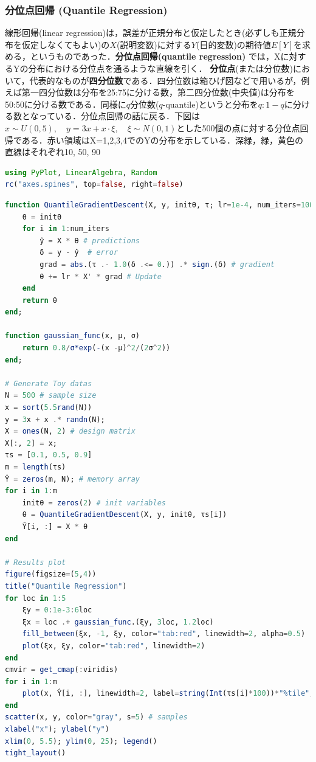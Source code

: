 \subsubsection{分位点回帰 (Quantile Regression)}
線形回帰(linear regression)は，誤差が正規分布と仮定したとき(必ずしも正規分布を仮定しなくてもよい)の$X$(説明変数)に対する$Y$(目的変数)の期待値$E[Y]$を求める，というものであった．\textbf{分位点回帰(quantile regression)} では，Xに対するYの分布における分位点を通るような直線を引く．
\textbf{分位点}(または分位数)において，代表的なものが\textbf{四分位数}である．四分位数は箱ひげ図などで用いるが，例えば第一四分位数は分布を25:75に分ける数，第二四分位数(中央値)は分布を50:50に分ける数である．同様に$q$分位数($q$-quantile)というと分布を$q:1-q$に分ける数となっている．分位点回帰の話に戻る．下図は$x\sim U(0, 5),\quad y=3x+x\cdot \xi,\quad \xi\sim N(0,1)$とした500個の点に対する分位点回帰である．赤い領域はX=1,2,3,4でのYの分布を示している．深緑，緑，黄色の直線はそれぞれ10, 50, 90%
\begin{lstlisting}[language=julia]
using PyPlot, LinearAlgebra, Random
rc("axes.spines", top=false, right=false)
\end{lstlisting}
\begin{lstlisting}[language=julia]
function QuantileGradientDescent(X, y, initθ, τ; lr=1e-4, num_iters=10000)
    θ = initθ
    for i in 1:num_iters
        ŷ = X * θ # predictions
        δ = y - ŷ  # error
        grad = abs.(τ .- 1.0(δ .<= 0.)) .* sign.(δ) # gradient
        θ += lr * X' * grad # Update
    end
    return θ
end;

function gaussian_func(x, μ, σ)
    return 0.8/σ*exp(-(x -μ)^2/(2σ^2))
end;

# Generate Toy datas
N = 500 # sample size
x = sort(5.5rand(N))
y = 3x + x .* randn(N);
X = ones(N, 2) # design matrix
X[:, 2] = x;
τs = [0.1, 0.5, 0.9]
m = length(τs) 
Ŷ = zeros(m, N); # memory array
for i in 1:m
    initθ = zeros(2) # init variables
    θ = QuantileGradientDescent(X, y, initθ, τs[i])
    Ŷ[i, :] = X * θ
end

# Results plot
figure(figsize=(5,4))
title("Quantile Regression")
for loc in 1:5
    ξy = 0:1e-3:6loc
    ξx = loc .+ gaussian_func.(ξy, 3loc, 1.2loc)
    fill_between(ξx, -1, ξy, color="tab:red", linewidth=2, alpha=0.5)
    plot(ξx, ξy, color="tab:red", linewidth=2)
end
cmvir = get_cmap(:viridis)
for i in 1:m
    plot(x, Ŷ[i, :], linewidth=2, label=string(Int(τs[i]*100))*"%tile", color=cmvir(i/m)) # regression line
end
scatter(x, y, color="gray", s=5) # samples
xlabel("x"); ylabel("y")
xlim(0, 5.5); ylim(0, 25); legend()
tight_layout()
\end{lstlisting}
